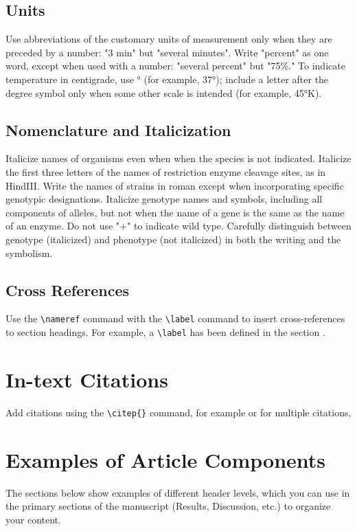 \documentclass[9pt,twocolumn,twoside,lineno]{gsajnl}
\begin{document}
\subsection{Units} Use abbreviations of the customary units of measurement only when they are preceded by a number: "3 min" but "several minutes". Write "percent" as one word, except when used with a number: "several percent" but "75\%." To indicate temperature in centigrade, use ° (for example, 37°); include a letter after the degree symbol only when some other scale is intended (for example, 45°K).

\subsection{Nomenclature and Italicization} Italicize names of organisms even when  when the species is not indicated.  Italicize the first three letters of the names of restriction enzyme cleavage sites, as in HindIII. Write the names of strains in roman except when incorporating specific genotypic designations. Italicize genotype names and symbols, including all components of alleles, but not when the name of a gene is the same as the name of an enzyme. Do not use "+" to indicate wild type. Carefully distinguish between genotype (italicized) and phenotype (not italicized) in both the writing and the symbolism.

\subsection{Cross References}
Use the \verb|\nameref| command with the \verb|\label| command to insert cross-references to section headings. For example, a \verb|\label| has been defined in the section .

\section{In-text Citations}

Add citations using the \verb|\citep{}| command, for example \citep{neher2013genealogies} or for multiple citations, \citep{neher2013genealogies, rodelsperger2014characterization}

\section{Examples of Article Components}
\label{sec:examples}

The sections below show examples of different header levels, which you can use in the primary sections of the manuscript (Results, Discussion, etc.) to organize your content.
\end{document}
